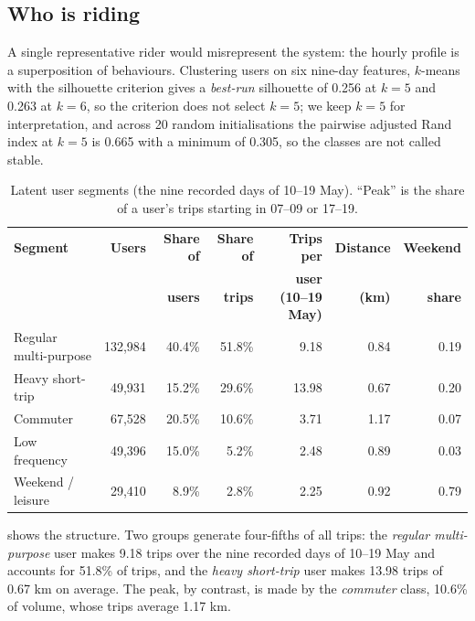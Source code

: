 \subsection{Who is riding}

A single representative rider would misrepresent the system: the hourly profile is a
superposition of behaviours. Clustering users on six nine-day features, $k$-means
\cite{lloyd1982} with the silhouette criterion \cite{rousseeuw1987} gives a
\emph{best-run} silhouette of 0.256 at $k=5$ and 0.263 at $k=6$, so the criterion does
not select $k=5$; we keep $k=5$ for interpretation, and across 20 random
initialisations the pairwise adjusted Rand index at $k=5$ is 0.665 with a minimum of
0.305, so the classes are not called stable.

\begin{table}[htbp]
\centering
\footnotesize
\caption[Latent user segments]{Latent user segments (the nine recorded days of 10--19 May). ``Peak'' is the share of a user's trips
starting in 07--09 or 17--19.}
\label{tab:seg}
\scriptsize
\begin{tabular}{@{}lrrrrrr@{}}
\toprule
\textbf{Segment} & \textbf{Users} & \textbf{Share of} & \textbf{Share of} &
\textbf{Trips per} & \textbf{Distance} & \textbf{Weekend} \\
 & & \textbf{users} & \textbf{trips} & \textbf{user (10--19 May)} & \textbf{(km)} & \textbf{share} \\
\midrule
Regular multi-purpose & 132,984 & 40.4\% & 51.8\% & 9.18 & 0.84 & 0.19 \\
Heavy short-trip & 49,931 & 15.2\% & 29.6\% & 13.98 & 0.67 & 0.20 \\
Commuter & 67,528 & 20.5\% & 10.6\% & 3.71 & 1.17 & 0.07 \\
Low frequency & 49,396 & 15.0\% & 5.2\% & 2.48 & 0.89 & 0.03 \\
Weekend / leisure & 29,410 & 8.9\% & 2.8\% & 2.25 & 0.92 & 0.79 \\
\bottomrule
\end{tabular}
\end{table}

 shows the structure. Two groups generate four-fifths of all trips:
the \emph{regular multi-purpose} user makes 9.18 trips over the nine recorded days of
10--19 May and accounts for 51.8\% of trips, and the \emph{heavy short-trip}
user makes 13.98 trips of 0.67 km on average. The peak, by contrast, is made by the
\emph{commuter} class, 10.6\% of volume, whose trips average 1.17 km.
